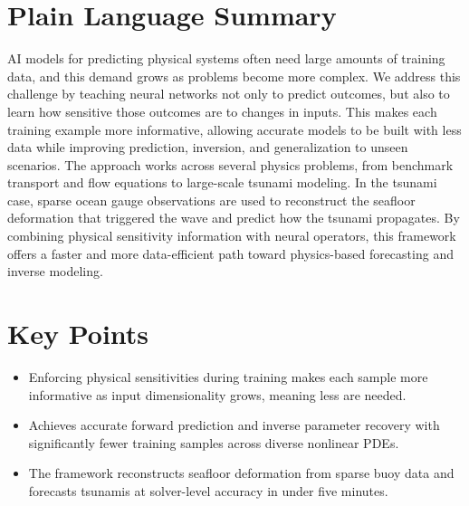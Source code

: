 \documentclass[pdflatex,sn-mathphys-num]{sn-jnl}
\theoremstyle{thmstyleone}%
\theoremstyle{thmstyletwo}%
\theoremstyle{thmstylethree}%
\begin{document}
\maketitle

\section*{Plain Language Summary}
AI models for predicting physical systems often need large amounts of training data, and this demand grows as problems become more complex. We address this challenge by teaching neural networks not only to predict outcomes, but also to learn how sensitive those outcomes are to changes in inputs. This makes each training example more informative, allowing accurate models to be built with less data while improving prediction, inversion, and generalization to unseen scenarios. The approach works across several physics problems, from benchmark transport and flow equations to large-scale tsunami modeling. In the tsunami case, sparse ocean gauge observations are used to reconstruct the seafloor deformation that triggered the wave and predict how the tsunami propagates. By combining physical sensitivity information with neural operators, this framework offers a faster and more data-efficient path toward physics-based forecasting and inverse modeling.


\section*{Key Points}
\begin{itemize}
    \item Enforcing physical sensitivities during training makes each sample more informative as input dimensionality grows, meaning less are needed.
    \item Achieves accurate forward prediction and inverse parameter recovery with significantly fewer training samples across diverse nonlinear PDEs.
    \item The framework reconstructs seafloor deformation from sparse buoy data and forecasts tsunamis at solver-level accuracy in under five minutes.
\end{itemize}












\end{document}
